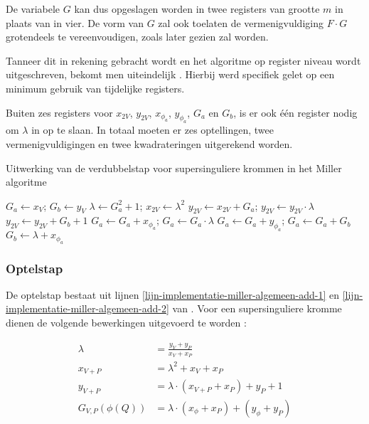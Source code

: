 De variabele $G$ kan dus opgeslagen worden in twee registers van grootte $m$ in plaats van in vier. De vorm van $G$ zal ook toelaten de vermenigvuldiging $F \cdot G$ grotendeels te vereenvoudigen, zoals later gezien zal worden.

Tanneer dit in rekening gebracht wordt en het algoritme op register niveau wordt uitgeschreven, bekomt men uiteindelijk . Hierbij werd specifiek gelet op een minimum gebruik van tijdelijke registers.

Buiten zes registers voor $x_{2V}$, $y_{2V}$, $x_{\phi_a}$, $y_{\phi_a}$, $G_a$ en $G_b$, is er ook \'e\'en register nodig om $\lambda$ in op te slaan. In totaal moeten er zes optellingen, twee vermenigvuldigingen en twee kwadrateringen uitgerekend worden.

\begin{algorithm}[h]
	\caption{Uitwerking van de verdubbelstap voor supersinguliere krommen in het Miller algoritme}
	\label{algoritme-implementatie-miller-double-detail}
	$G_a \gets x_V$; $G_b \gets y_V$\;
	$\lambda \gets G_a^2 + 1$; $x_{2V} \gets \lambda ^2$\;
	$y_{2V} \gets x_{2V} + G_a$; $y_{2V} \gets y_{2V} \cdot \lambda$\;
	$y_{2V} \gets y_{2V} + G_b + 1$\;
	$G_a \gets G_a + x_{\phi_a}$; $G_a \gets G_a \cdot \lambda$\;
	$G_a \gets G_a + y_{\phi_a}$; $G_a \gets G_a + G_b$\;
	$G_b \gets \lambda + x_{\phi_a}$\;
\end{algorithm}

\subsubsection{Optelstap}

De optelstap bestaat uit lijnen \ref{lijn-implementatie-miller-algemeen-add-1} en \ref{lijn-implementatie-miller-algemeen-add-2} van . Voor een supersinguliere kromme dienen de volgende bewerkingen uitgevoerd te worden \cite{bertoni, hankerson-book}:

\[\begin{aligned}
	\lambda &= \frac{y_V + y_P}{x_V + x_P}\\
	x_{V + P} &= \lambda ^2 + x_V + x_P\\
	y_{V + P} &= \lambda \cdot (x_{V + P} + x_P) + y_P + 1\\
	G_{V,P}(\phi(Q)) &= \lambda \cdot (x_{\phi} + x_P) + (y_{\phi} + y_P)\\
\end{aligned}\]

